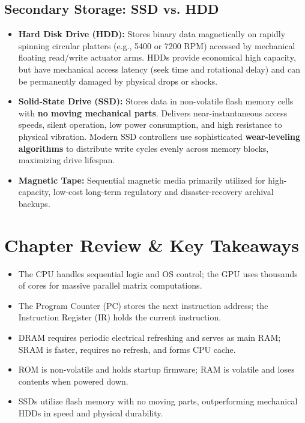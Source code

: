 \subsection{Secondary Storage: SSD vs. HDD}
\begin{itemize}[leftmargin=1.2em]
    \item \textbf{Hard Disk Drive (HDD):} Stores binary data magnetically on rapidly spinning circular platters (e.g., 5400 or 7200 RPM) accessed by mechanical floating read/write actuator arms. HDDs provide economical high capacity, but have mechanical access latency (seek time and rotational delay) and can be permanently damaged by physical drops or shocks.
    \item \textbf{Solid-State Drive (SSD):} Stores data in non-volatile flash memory cells with \textbf{no moving mechanical parts}. Delivers near-instantaneous access speeds, silent operation, low power consumption, and high resistance to physical vibration. Modern SSD controllers use sophisticated \textbf{wear-leveling algorithms} to distribute write cycles evenly across memory blocks, maximizing drive lifespan.
    \item \textbf{Magnetic Tape:} Sequential magnetic media primarily utilized for high-capacity, low-cost long-term regulatory and disaster-recovery archival backups.
\end{itemize}

\section{Chapter Review \& Key Takeaways}
\begin{tcolorbox}[enhanced, colback=boxgreenbg, colframe=boxgreenborder, boxrule=1pt, arc=4pt, title={\bfseries\sffamily Summary Checklist}]
\sffamily\small
\begin{itemize}[leftmargin=1.2em, itemsep=2pt]
    \item The CPU handles sequential logic and OS control; the GPU uses thousands of cores for massive parallel matrix computations.
    \item The Program Counter (PC) stores the next instruction address; the Instruction Register (IR) holds the current instruction.
    \item DRAM requires periodic electrical refreshing and serves as main RAM; SRAM is faster, requires no refresh, and forms CPU cache.
    \item ROM is non-volatile and holds startup firmware; RAM is volatile and loses contents when powered down.
    \item SSDs utilize flash memory with no moving parts, outperforming mechanical HDDs in speed and physical durability.
\end{itemize}
\end{tcolorbox}
